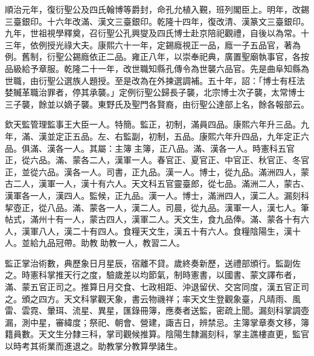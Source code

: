 \begin{pinyinscope}
順治元年，復衍聖公及四氏翰博等爵封，命孔允植入覲，班列閣臣上。明年，改錫三臺銀印。十六年改滿、漢文三臺銀印。乾隆十四年，復改清、漢篆文三臺銀印。九年，世祖視學釋奠，召衍聖公孔興燮及四氏博士赴京陪祀觀禮，自後以為常。十三年，依例授光祿大夫。康熙六十一年，定錫廕視正一品，廕一子五品官，著為例。舊制，衍聖公錫廕依正二品。雍正八年，以崇奉祀典，廣置聖廟執事官，各按品級給予章服。乾隆二十一年，改世職知縣孔傳令為世襲六品官。先是曲阜知縣為世職，由衍聖公選族人題授。至是改為在外揀選調補。五十年，詔：「博士有枉法婪贓革職治罪者，停其承襲。」定例衍聖公歸長子襲，北宗博士次子襲，太常博士三子襲，餘並以嫡子襲。東野氏及聖門各賢裔，由衍聖公達部上名，餘各報部云。

欽天監管理監事王大臣一人。特簡。監正，初制，滿員四品。康熙六年升三品。九年，滿、漢並定正五品。左、右監副，初制，五品。康熙六年升四品，九年定正六品。俱滿、漢各一人。其屬：主簿主簿，正八品。滿、漢各一人。時憲科五官正，從六品。滿、蒙各二人，漢軍一人。春官正、夏官正、中官正、秋官正、冬官正，並從六品。漢各一人。司書，正九品。漢一人。博士，從九品。滿洲四人，蒙古二人，漢軍一人，漢十有六人。天文科五官靈臺郎，從七品。滿洲二人，蒙古、漢軍各一人，漢四人。監候，正九品。漢一人。博士，滿洲四人，漢二人。漏刻科挈壺正，從八品。滿、蒙各一人，漢二人。司晨，從九品。漢軍一人，漢七人。筆帖式，滿州十有一人，蒙古四人，漢軍二人。天文生，食九品俸。滿、蒙各十有六人，漢軍八人，漢二十有四人。食糧天文生，漢五十有六人。食糧陰陽生，漢十人。並給九品冠帶。助教助教一人，教習二人。

監正掌治術數，典歷象日月星辰，宿離不貸。歲終奏新歷，送禮部頒行。監副佐之。時憲科掌推天行之度，驗歲差以均節氣，制時憲書，以國書、蒙文譯布者，滿、蒙五官正司之。推算日月交食、七政相距、沖退留伏、交宮同度，漢五官正司之。頒之四方。天文科掌觀天象，書云物禨祥；率天文生登觀象臺，凡晴雨、風雷、雲霓、暈珥、流星、異星，匯錄冊簿，應奏者送監，密疏上聞。漏刻科掌調壺漏，測中星，審緯度；祭祀、朝會、營建，諏吉日，辨禁忌。主簿掌章奏文移，簿籍員數。天文生分隸三科，掌司觀候推算。陰陽生隸漏刻科，掌主譙樓直更，監官以時考其術業而進退之。助教掌分教算學諸生。


\end{pinyinscope}
